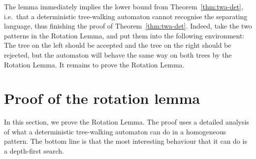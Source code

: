 The lemma immediately implies the lower bound from Theorem~\ref{thm:twa-det}, i.e.~that a deterministic tree-walking automaton cannot recognise the separating language, thus finishing the proof of Theorem~\ref{thm:twa-det}. Indeed,  take the two patterns in the Rotation Lemma, and put them into the following environment:
The tree on the left should be accepted and the tree on the right should be rejected, but the automaton will behave the same way on both trees by the Rotation Lemma. It remains to prove the Rotation Lemma.

\section{Proof of the rotation lemma}
\label{sec:rotation-lemma}
In this section, we prove the Rotation Lemma. The proof uses a detailed analysis of what a deterministic tree-walking automaton can do in a homogeneous pattern. The bottom line is that the most interesting behaviour that it can do is a depth-first search.
